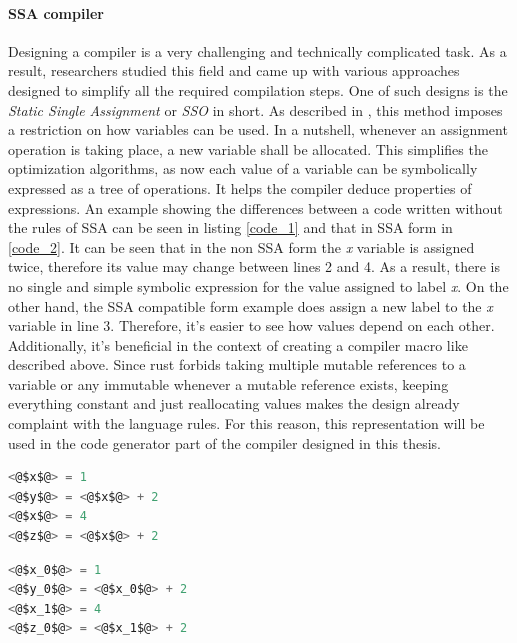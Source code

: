 \paragraph{SSA compiler} \label{ssadec}
Designing a compiler is a very challenging and technically complicated task. As a result, researchers studied this field and came up with various approaches designed to simplify all the required compilation steps. One of such designs is the \textit{Static Single Assignment} or \textit{SSO} in short. As described in \cite{ssabook}, this method imposes a restriction on how variables can be used. In a nutshell, whenever an assignment operation is taking place, a new variable shall be allocated. This simplifies the optimization algorithms, as now each value of a variable can be symbolically expressed as a tree of operations. It helps the compiler deduce properties of expressions. An example showing the differences between a code written without the rules of SSA can be seen in listing \ref{code_1} and that in SSA form in \ref{code_2}. It can be seen that in the non SSA form the \textit{x} variable is assigned twice, therefore its value may change between lines 2 and 4. As a result, there is no single and simple symbolic expression for the value assigned to label \textit{x}. On the other hand, the SSA compatible form example does assign a new label to the \textit{x} variable in line 3. Therefore, it's easier to see how values depend on each other. Additionally, it's beneficial in the context of creating a compiler macro like described above. Since rust forbids taking multiple mutable references to a variable or any immutable whenever a mutable reference exists, keeping everything constant and just reallocating values makes the design already complaint with the language rules. For this reason, this representation will be used in the code generator part of the compiler designed in this thesis.

\begin{minipage}{.4\textwidth}
    \begin{lstlisting}[language=C,caption={Code exmaple containing assigments},captionpos=b,label={code_1}]
<@$x$@> = 1
<@$y$@> = <@$x$@> + 2
<@$x$@> = 4
<@$z$@> = <@$x$@> + 2
    \end{lstlisting}
\end{minipage}
\hfill\vline\hfill
\begin{minipage}{.4\textwidth}
    \begin{lstlisting}[language=C,caption={Code exmaple in SSO notation},captionpos=b,label={code_2}]
<@$x_0$@> = 1
<@$y_0$@> = <@$x_0$@> + 2
<@$x_1$@> = 4
<@$z_0$@> = <@$x_1$@> + 2
    \end{lstlisting}    
\end{minipage}